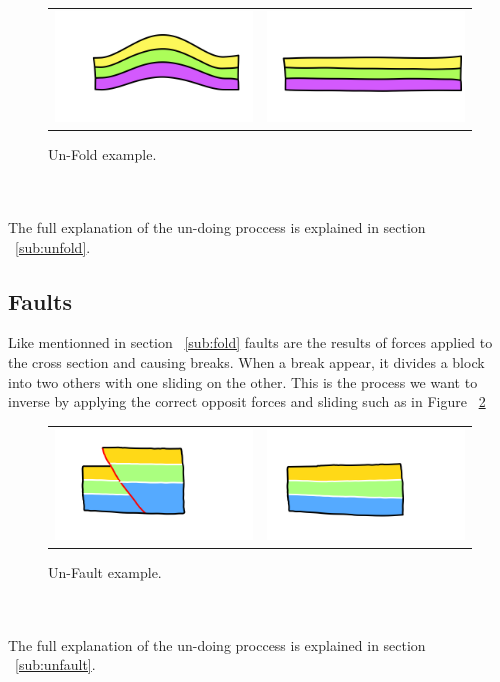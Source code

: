 \documentclass[12pt, a4paper]{report} %
\begin{document}
\begin{figure}[htb]
\centering
\begin{tabular}{@{}cc@{}}
\includegraphics[width=.35\textwidth]{unFoldDescription0.png}&
\includegraphics[width=.35\textwidth]{unFoldDescription1.png}\\
\end{tabular}
\caption{Un-Fold example.}
\label{unfoldeg}
\end{figure}\\\\
The full explanation of the un-doing proccess is explained in section ~\ref{sub:unfold}.

\subsection{Faults}
\label{sub:fault}
Like mentionned in section ~\ref{sub:fold} faults are the results of forces applied to the cross section and causing breaks. When a break appear, it divides a block into two others with one sliding on the other. This is the process we want to inverse by applying the correct opposit forces and sliding such as in Figure ~\ref{unfaulteg}

\begin{figure}[htb]
\centering
\begin{tabular}{@{}cc@{}}
\includegraphics[width=.35\textwidth]{unFaultDescription0.png}&
\includegraphics[width=.35\textwidth]{unFaultDescription1.png}\\
\end{tabular}
\caption{Un-Fault example.}
\label{unfaulteg}
\end{figure}\\\\
The full explanation of the un-doing proccess is explained in section ~\ref{sub:unfault}.
\end{document}
